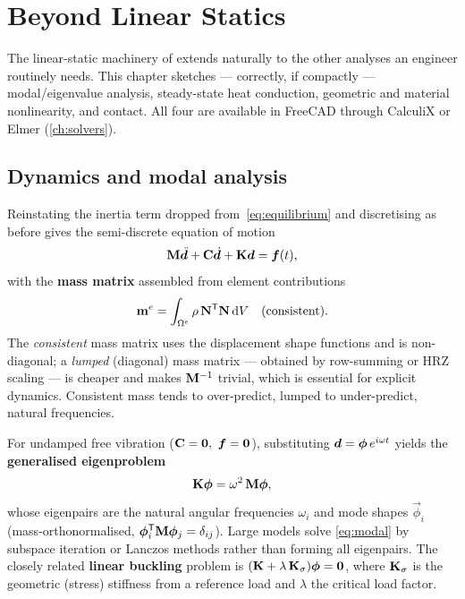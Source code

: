 \chapter{Beyond Linear Statics}
\label{ch:extensions}

The linear-static machinery of 
extends naturally to the other analyses an engineer routinely needs. This
chapter sketches --- correctly, if compactly --- modal/eigenvalue
analysis, steady-state heat conduction, geometric and material
nonlinearity, and contact. All four are available in FreeCAD through
CalculiX or Elmer (\cref{ch:solvers}).

\section{Dynamics and modal analysis}

Reinstating the inertia term dropped from~\eqref{eq:equilibrium} and
discretising as before gives the semi-discrete equation of motion
\begin{equation}
  \mathbf{M}\ddot{\bm{d}} + \mathbf{C}\dot{\bm{d}} + \mathbf{K}\bm{d} = \bm{f}(t),
\end{equation}
with the \textbf{mass matrix} assembled from element contributions
\begin{equation}
  \mathbf{m}^{e} = \int_{\Omega^e}\rho\,\mathbf{N}^{\mathsf{T}}\mathbf{N}\,\mathrm{d} V \quad\text{(consistent)} .
\end{equation}
The \emph{consistent} mass matrix uses the displacement shape functions
and is non-diagonal; a \emph{lumped} (diagonal) mass matrix --- obtained
by row-summing or HRZ scaling --- is cheaper and makes $\mathbf{M}^{-1}$
trivial, which is essential for explicit dynamics. Consistent mass tends
to over-predict, lumped to under-predict, natural frequencies.

For undamped free vibration ($\mathbf{C}=\mathbf{0},\ \bm{f}=\bm{0}$), substituting
$\bm{d}=\bm{\phi}\,e^{i\omega t}$ yields the \textbf{generalised
eigenproblem}
\begin{equation}
  \mathbf{K}\bm{\phi} = \omega^2\,\mathbf{M}\bm{\phi} ,
  \label{eq:modal}
\end{equation}
whose eigenpairs are the natural angular frequencies $\omega_i$ and
mode shapes $\vec\phi_i$ (mass-orthonormalised,
$\bm{\phi}_i^{\mathsf{T}}\mathbf{M}\bm{\phi}_j=\delta_{ij}$). Large models solve
\eqref{eq:modal} by subspace iteration or Lanczos methods rather than
forming all eigenpairs. The closely related \textbf{linear buckling}
problem is $(\mathbf{K}+\lambda\,\mathbf{K}_\sigma)\bm{\phi}=\bm{0}$, where
$\mathbf{K}_\sigma$ is the geometric (stress) stiffness from a reference load
and $\lambda$ the critical load factor.

